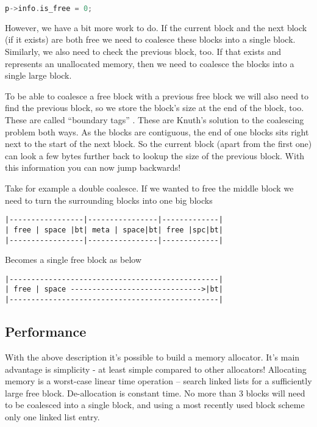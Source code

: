 \begin{lstlisting}[language=C]
p->info.is_free = 0;
\end{lstlisting}

However, we have a bit more work to do.
If the current block and the next block (if it exists) are both free we need to coalesce these blocks into a single block.
Similarly, we also need to check the previous block, too.
If that exists and represents an unallocated memory, then we need to coalesce the blocks into a single large block.

To be able to coalesce a free block with a previous free block we will also need to find the previous block, so we store the block's size at the end of the block, too.
These are called ``boundary tags'' \cite{knuth1974art}.
These are Knuth's solution to the coalescing problem both ways.
As the blocks are contiguous, the end of one blocks sits right next to the start of the next block.
So the current block (apart from the first one) can look a few bytes further back to lookup the size of the previous block.
With this information you can now jump backwards!

Take for example a double coalesce.
If we wanted to free the middle block we need to turn the surrounding blocks into one big blocks

\begin{verbatim}
|-----------------|----------------|-------------|
| free | space |bt| meta | space|bt| free |spc|bt|
|-----------------|----------------|-------------|
\end{verbatim}

Becomes a single free block as below

\begin{verbatim}
|------------------------------------------------|
| free | space ------------------------------>|bt|
|------------------------------------------------|
\end{verbatim}

\subsection{Performance}

With the above description it's possible to build a memory allocator.
It's main advantage is simplicity - at least simple compared to other allocators!
Allocating memory is a worst-case linear time operation -- search linked lists for a sufficiently large free block.
De-allocation is constant time.
No more than 3 blocks will need to be coalesced into a single block, and using a most recently used block scheme only one linked list entry.

